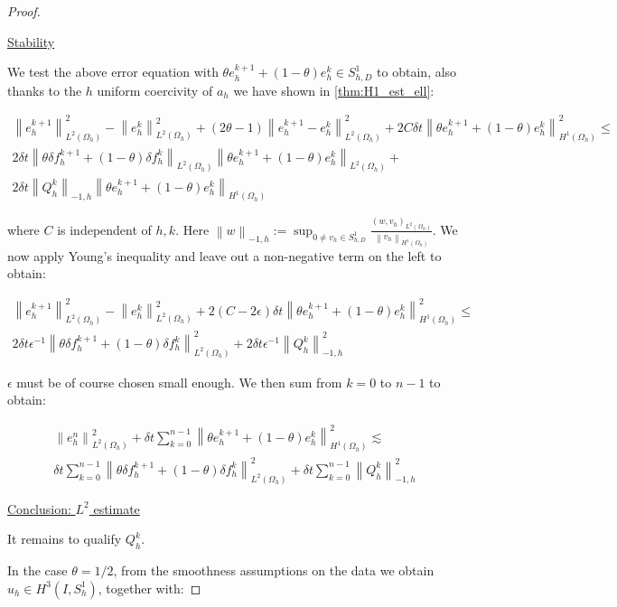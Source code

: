 \documentclass[english,a4paper,10pt,oneside]{scrbook}	%
\theoremstyle{break}
\newenvironment{mproof}[1][\proofname]{%
  \begin{proof}[#1]$ $\par\nobreak\ignorespaces
}{%
  \end{proof}
}
\renewcommand*{\proofname}{Proof}
\theoremstyle{remark}
\newcommand{\ds}{\displaystyle}
\newcommand{\norm}[1]{\left\lVert#1\right\rVert}
\begin{document}
\begin{mproof}
\underline{Stability}

We test the above error equation with $\theta e_h^{k+1}+(1-\theta)e_h^k \in S^1_{h,D}$ to obtain, also thanks to the $h$ uniform coercivity of $a_h$ we have shown in \cref{thm:H1_est_ell}:

\begin{align*}
\norm{e_{h}^{k+1}}_{L^2(\Omega_h)}^2-\norm{e_h^k}^2_{L^2(\Omega_h)}+ (2\theta -1)\norm{e_h^{k+1}-e_h^{k}}_{L^2(\Omega_h)}^2 + 2C\delta t \norm{\theta e_h^{k+1}+(1-\theta)e^k_h}_{H^1(\Omega_h)}^2 \leq \\ 2\delta t \norm{\theta \delta f_h^{k+1}+(1-\theta)\delta f_h^k}_{L^2(\Omega_h)}\norm{\theta e_h^{k+1}+(1-\theta)e_h^k}_{L^2(\Omega_h)} +\\ 2\delta t \norm{ Q_h^k}_{-1,h}\norm{\theta e_h^{k+1}+(1-\theta)e_h^k}_{H^1(\Omega_h)}
\end{align*}

where $C$ is independent of $h,k$. Here $\norm{w}_{-1,h}:=\ds \sup_{0 \neq v_h \in S^1_{h,D} }\frac{(w,v_h)_{L^2(\Omega_h)}}{\norm{v_h}_{H^1(\Omega_h)}}$. We now apply Young's inequality and leave out a non-negative term on the left to obtain:

\begin{align*}
\norm{e_{h}^{k+1}}_{L^2(\Omega_h)}^2-\norm{e_h^k}^2_{L^2(\Omega_h)}+ 2(C - 2\epsilon) \delta t \norm{\theta e_h^{k+1}+(1-\theta)e^k_h}_{H^1(\Omega_h)}^2 \leq \\
2\delta t\epsilon^{-1} \norm{\theta \delta f_h^{k+1}+(1-\theta)\delta f_h^k}_{L^2(\Omega_h)}^2 + 2\delta t \epsilon^{-1}\norm{ Q_h^k}_{-1,h}^2
\end{align*}

$\epsilon$ must be of course chosen small enough. We then sum from $k=0$ to $n-1$ to obtain:

\begin{align*}
\norm{e_{h}^{n}}_{L^2(\Omega_h)}^2 + \delta t \sum_{k=0}^{n-1}\norm{\theta e_h^{k+1}+(1-\theta)e^k_h}_{H^1(\Omega_h)}^2 \lesssim \\
\delta t\sum_{k=0}^{n-1} \norm{\theta \delta f_h^{k+1}+(1-\theta)\delta f_h^k}_{L^2(\Omega_h)}^2 + \delta t \sum_{k=0}^{n-1}\norm{ Q_h^k}_{-1,h}^2
\end{align*}

\underline{Conclusion: $L^2$ estimate}

It remains to qualify $ Q_h^k$.

In the case $\theta = 1/2$, from the smoothness assumptions on the data we obtain $u_h \in H^3(I,S^1_h)$, together with:


\end{mproof}
\end{document}
